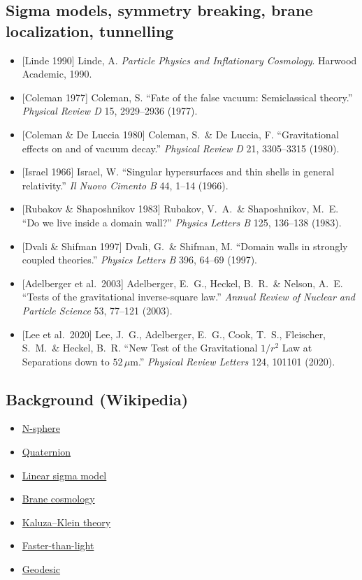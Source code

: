 \documentclass[11pt,a4paper]{article}
\begin{document}
\subsection*{Sigma models, symmetry breaking, brane localization, tunnelling}
\begin{itemize}[leftmargin=*]
\item {[Linde 1990]} Linde, A. \emph{Particle Physics and Inflationary Cosmology}. Harwood Academic, 1990.
\item {[Coleman 1977]} Coleman, S. ``Fate of the false vacuum: Semiclassical theory.'' \emph{Physical Review D} 15, 2929--2936 (1977).
\item {[Coleman \& De Luccia 1980]} Coleman, S.\ \& De Luccia, F. ``Gravitational effects on and of vacuum decay.'' \emph{Physical Review D} 21, 3305--3315 (1980).
\item {[Israel 1966]} Israel, W. ``Singular hypersurfaces and thin shells in general relativity.'' \emph{Il Nuovo Cimento B} 44, 1--14 (1966).
\item {[Rubakov \& Shaposhnikov 1983]} Rubakov, V.~A.\ \& Shaposhnikov, M.~E. ``Do we live inside a domain wall?'' \emph{Physics Letters B} 125, 136--138 (1983).
\item {[Dvali \& Shifman 1997]} Dvali, G.\ \& Shifman, M. ``Domain walls in strongly coupled theories.'' \emph{Physics Letters B} 396, 64--69 (1997).
\item {[Adelberger et al.\ 2003]} Adelberger, E.~G., Heckel, B.~R.\ \& Nelson, A.~E. ``Tests of the gravitational inverse-square law.'' \emph{Annual Review of Nuclear and Particle Science} 53, 77--121 (2003).
\item {[Lee et al.\ 2020]} Lee, J.~G., Adelberger, E.~G., Cook, T.~S., Fleischer, S.~M.\ \& Heckel, B.~R. ``New Test of the Gravitational $1/r^2$ Law at Separations down to $52\,\mu$m.'' \emph{Physical Review Letters} 124, 101101 (2020).
\end{itemize}

\subsection*{Background (Wikipedia)}
\begin{itemize}[leftmargin=*]
\item \href{https://en.wikipedia.org/wiki/N-sphere}{N-sphere}
\item \href{https://en.wikipedia.org/wiki/Quaternion}{Quaternion}
\item \href{https://en.wikipedia.org/wiki/Sigma_model}{Linear sigma model}
\item \href{https://en.wikipedia.org/wiki/Brane_cosmology}{Brane cosmology}
\item \href{https://en.wikipedia.org/wiki/Kaluza\%E2\%80\%93Klein_theory}{Kaluza--Klein theory}
\item \href{https://en.wikipedia.org/wiki/Faster-than-light}{Faster-than-light}
\item \href{https://en.wikipedia.org/wiki/Geodesic}{Geodesic}
\end{itemize}
\end{document}
